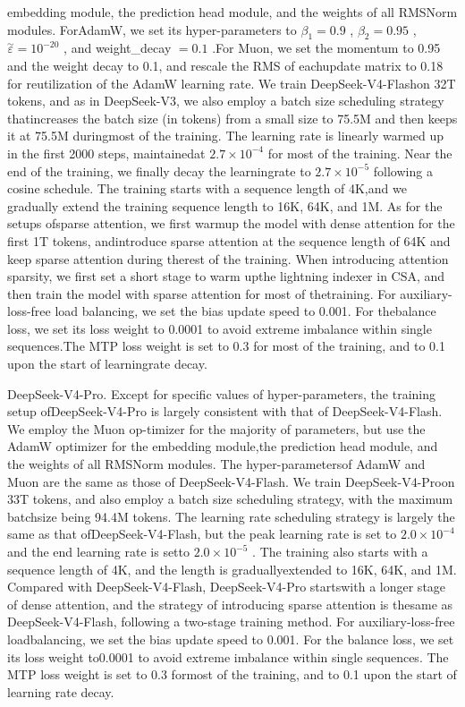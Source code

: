 \documentclass[
  10
]{article}
\begin{document}
embedding module, the prediction head module, and the weights of all
RMSNorm modules. ForAdamW, we set its hyper-parameters to
\(\beta _ { 1 } = 0 . 9\) , \(\beta _ { 2 } = 0 . 9 5\) ,
\(\stackrel { \sim } { \varepsilon } = 1 0 ^ { - 2 0 }\) , and
weight\_decay \(= 0 . 1\) .For Muon, we set the momentum to 0.95 and the
weight decay to 0.1, and rescale the RMS of eachupdate matrix to 0.18
for reutilization of the AdamW learning rate. We train
DeepSeek-V4-Flashon 32T tokens, and as in DeepSeek-V3, we also employ a
batch size scheduling strategy thatincreases the batch size (in tokens)
from a small size to 75.5M and then keeps it at 75.5M duringmost of the
training. The learning rate is linearly warmed up in the first 2000
steps, maintainedat \(2 . 7 \times 1 0 ^ { - 4 }\) for most of the
training. Near the end of the training, we finally decay the
learningrate to \(2 . 7 \times 1 0 ^ { - 5 }\) following a cosine
schedule. The training starts with a sequence length of 4K,and we
gradually extend the training sequence length to 16K, 64K, and 1M. As
for the setups ofsparse attention, we first warmup the model with dense
attention for the first 1T tokens, andintroduce sparse attention at the
sequence length of 64K and keep sparse attention during therest of the
training. When introducing attention sparsity, we first set a short
stage to warm upthe lightning indexer in CSA, and then train the model
with sparse attention for most of thetraining. For auxiliary-loss-free
load balancing, we set the bias update speed to 0.001. For thebalance
loss, we set its loss weight to 0.0001 to avoid extreme imbalance within
single sequences.The MTP loss weight is set to 0.3 for most of the
training, and to 0.1 upon the start of learningrate decay.

DeepSeek-V4-Pro. Except for specific values of hyper-parameters, the
training setup ofDeepSeek-V4-Pro is largely consistent with that of
DeepSeek-V4-Flash. We employ the Muon op-timizer for the majority of
parameters, but use the AdamW optimizer for the embedding module,the
prediction head module, and the weights of all RMSNorm modules. The
hyper-parametersof AdamW and Muon are the same as those of
DeepSeek-V4-Flash. We train DeepSeek-V4-Proon 33T tokens, and also
employ a batch size scheduling strategy, with the maximum batchsize
being 94.4M tokens. The learning rate scheduling strategy is largely the
same as that ofDeepSeek-V4-Flash, but the peak learning rate is set to
\(2 . 0 \times 1 0 ^ { - 4 }\) and the end learning rate is setto
\(2 . 0 \times 1 0 ^ { - 5 }\) . The training also starts with a
sequence length of 4K, and the length is graduallyextended to 16K, 64K,
and 1M. Compared with DeepSeek-V4-Flash, DeepSeek-V4-Pro startswith a
longer stage of dense attention, and the strategy of introducing sparse
attention is thesame as DeepSeek-V4-Flash, following a two-stage
training method. For auxiliary-loss-free loadbalancing, we set the bias
update speed to 0.001. For the balance loss, we set its loss weight
to0.0001 to avoid extreme imbalance within single sequences. The MTP
loss weight is set to 0.3 formost of the training, and to 0.1 upon the
start of learning rate decay.
\end{document}
